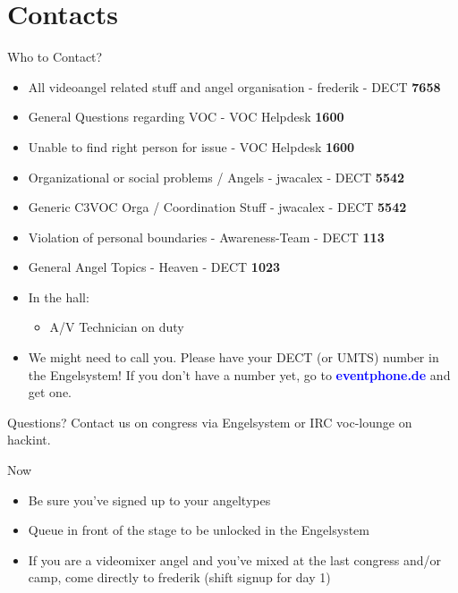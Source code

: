 \documentclass[aspectratio=169]{beamer}
\begin{document}
\section{Contacts}			%
\begin{frame}{Who to Contact?}
\begin{itemize}
	\item All videoangel related stuff and angel organisation - frederik - DECT \textbf{7658}
	\item General Questions regarding VOC - VOC Helpdesk \textbf{1600}
	\item Unable to find right person for issue - VOC Helpdesk \textbf{1600}
	\item Organizational or social problems / Angels - jwacalex - DECT \textbf{5542}
	\item Generic C3VOC Orga / Coordination Stuff - jwacalex - DECT \textbf{5542}
	\item Violation of personal boundaries - Awareness-Team - DECT \textbf{113}
	\item General Angel Topics - Heaven - DECT \textbf{1023}
	\item In the hall:
	\begin{itemize}
		\item A/V Technician on duty
	\end{itemize} 
	\item We might need to call you. Please have your DECT (or UMTS) number in the Engelsystem! If you don't have a number yet, go to 
	\textcolor{blue}{\textbf{eventphone.de}} and get one.
\end{itemize} 
\end{frame}

\begin{frame}{Questions?}
Contact us on congress via Engelsystem or IRC voc-lounge on hackint.
\end{frame}

\begin{frame}{Now}
	\begin{itemize}
		\item Be sure you've signed up to your angeltypes
		\item Queue in front of the stage to be unlocked in the Engelsystem
		\item If you are a videomixer angel and you've mixed at the last congress and/or camp, come directly to frederik (shift signup for day 1)
	\end{itemize} 
\end{frame}
\end{document}
